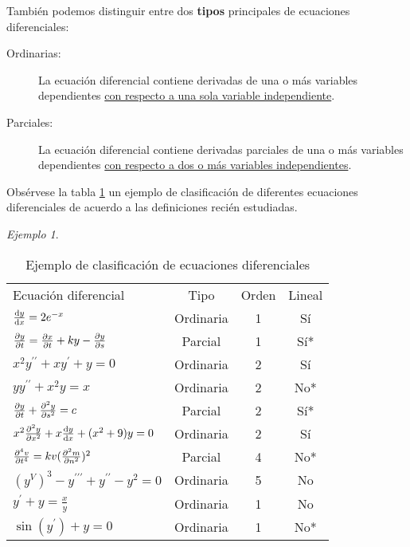 \documentclass[12pt]{article} %
\theoremstyle{remark} %
\newtheorem{ejemplo}{Ejemplo}[section]
\begin{document}
También podemos distinguir entre dos \textbf{tipos} principales de ecuaciones diferenciales:
\begin{description}
  \item[Ordinarias:] La ecuación diferencial contiene derivadas de una o más variables dependientes 
    \underline{con respecto a una sola variable independiente}.
  \item[Parciales:] La ecuación diferencial contiene derivadas parciales de una o más variables dependientes
    \underline{con respecto a dos o más variables independientes}.
\end{description}

Obsérvese la tabla \ref{tab:EjemploClasificacion} un ejemplo de clasificación de diferentes ecuaciones diferenciales de acuerdo a las definiciones 
recién estudiadas.

\begin{ejemplo}
\begin{table}
  \centering
  \caption{Ejemplo de clasificación de ecuaciones diferenciales}
  \label{tab:EjemploClasificacion}
  \begin{tabular}{lccc}
    Ecuación diferencial & Tipo & Orden & Lineal \\[0.5em]
    $\dv{y}{x} = 2e^{-x}$ & Ordinaria & 1 & Sí \\[0.6em]
    $\pdv{y}{t} = \pdv{x}{t} + ky - \pdv{y}{s}$ & Parcial & 1 & Sí* \\[0.6em]
    $x^2y^{\prime \prime} + xy^{\prime} + y = 0$ & Ordinaria & 2 & Sí \\[0.6em]
    $yy^{\prime \prime} + x^2y = x$ & Ordinaria & 2 & No* \\[0.6em]
    $\pdv{y}{t} + \pdv[2]{y}{s} = c$ &Parcial & 2 & Sí* \\[0.6em]
    $x^2 \pdv[2]{y}{x} + x \dv{y}{x} + (x^2 + 9)y = 0$ & Ordinaria & 2 & Sí \\[0.6em]
    $\pdv[4]{v}{t} = kv(\pdv[2]{m}{n})^2$ & Parcial & 4 & No* \\[0.6em]
    $(y^V)^3 - y^{\prime \prime \prime} + y^{\prime \prime} - y^2 = 0$ & Ordinaria & 5 & No \\[0.6em]
    $y^{\prime} + y = \frac{x}{y}$ & Ordinaria & 1 & No \\[0.6em]
    $\sin (y^{\prime}) + y = 0$ & Ordinaria & 1 & No*
  \end{tabular}
\end{table}
\end{ejemplo}
\end{document}
